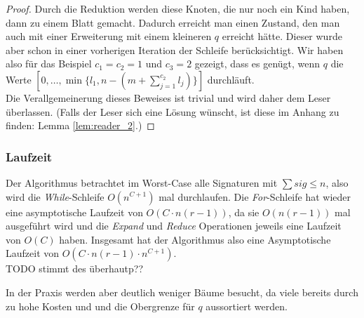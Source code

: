 \documentclass[a4paper,10pt,ngerman]{scrartcl}
\begin{document}
\begin{proof}
        Durch die Reduktion werden diese Knoten, die nur noch ein Kind haben, dann zu einem Blatt gemacht.
        Dadurch erreicht man einen Zustand, den man auch mit einer Erweiterung mit einem kleineren $q$ erreicht hätte.
        Dieser wurde aber schon in einer vorherigen Iteration der Schleife berücksichtigt.
        Wir haben also für das Beispiel $c_1 = c_2 = 1$ und $c_3 = 2$ gezeigt, dass es genügt, wenn $q$ die Werte $[0, \dots, \min\{l_1, n - (m + \sum^{c_2}_{j=1} l_j)\}]$ durchläuft.\\
        Die Verallgemeinerung dieses Beweises ist trivial und wird daher dem Leser überlassen.
        (Falls der Leser sich eine Lösung wünscht, ist diese im Anhang zu finden: Lemma \ref{lem:reader_2}.)
    \end{proof}

    \subsubsection{Laufzeit}
    Der Algorithmus betrachtet im Worst-Case alle Signaturen mit $\sum sig \le n$, also wird die \textit{While}-Schleife $O(n^{C+1})$ mal durchlaufen.
    Die \textit{For}-Schleife hat wieder eine asymptotische Laufzeit von $O(C \cdot n(r-1))$, da sie $O(n(r-1))$ mal ausgeführt wird und die \textit{Expand} und \textit{Reduce} Operationen jeweils eine Laufzeit von $O(C)$ haben. Insgesamt hat der Algorithmus also eine Asymptotische Laufzeit von $O(C \cdot n(r-1) \cdot n ^ {C + 1})$. \\ TODO stimmt des überhautp??

    In der Praxis werden aber deutlich weniger Bäume besucht, da viele bereits durch zu hohe Kosten und und die Obergrenze für $q$ aussortiert werden.
\end{document}
